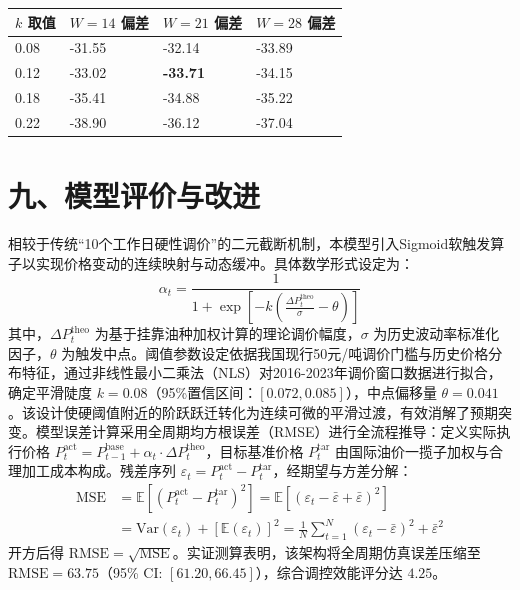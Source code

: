 \documentclass{mcmthesis}
\begin{document}
\begin{table}[htbp]
\centering
\begin{tabular}{l l l l}
\toprule
$k$ 取值 & $W=14$ 偏差 & $W=21$ 偏差 & $W=28$ 偏差 \\
\midrule
0.08 & -31.55 & -32.14 & -33.89 \\
0.12 & -33.02 & \textbf{-33.71} & -34.15 \\
0.18 & -35.41 & -34.88 & -35.22 \\
0.22 & -38.90 & -36.12 & -37.04 \\
\bottomrule
\end{tabular}
\end{table}


\section{ 九、模型评价与改进}

相较于传统“10个工作日硬性调价”的二元截断机制，本模型引入Sigmoid软触发算子以实现价格变动的连续映射与动态缓冲。具体数学形式设定为：
$$ \alpha_t = \frac{1}{1 + \exp\left[-k\left(\frac{\Delta P_t^{\text{theo}}}{\sigma} - \theta\right)\right]} \tag{1} $$
其中，$\Delta P_t^{\text{theo}}$ 为基于挂靠油种加权计算的理论调价幅度，$\sigma$ 为历史波动率标准化因子，$\theta$ 为触发中点。阈值参数设定依据我国现行50元/吨调价门槛与历史价格分布特征，通过非线性最小二乘法（NLS）对2016-2023年调价窗口数据进行拟合，确定平滑陡度 $k=0.08$（95\%置信区间：$[0.072, 0.085]$），中点偏移量 $\theta=0.041$。该设计使硬阈值附近的阶跃跃迁转化为连续可微的平滑过渡，有效消解了预期突变。模型误差计算采用全周期均方根误差（RMSE）进行全流程推导：定义实际执行价格 $P_t^{\text{act}} = P_{t-1}^{\text{base}} + \alpha_t \cdot \Delta P_t^{\text{theo}}$，目标基准价格 $P_t^{\text{tar}}$ 由国际油价一揽子加权与合理加工成本构成。残差序列 $\varepsilon_t = P_t^{\text{act}} - P_t^{\text{tar}}$，经期望与方差分解：
$$ \begin{aligned} \text{MSE} &= \mathbb{E}\left[(P_t^{\text{act}} - P_t^{\text{tar}})^2\right] = \mathbb{E}\left[(\varepsilon_t - \bar{\varepsilon} + \bar{\varepsilon})^2\right] \\ &= \text{Var}(\varepsilon_t) + \left[\mathbb{E}(\varepsilon_t)\right]^2 = \frac{1}{N}\sum_{t=1}^{N} (\varepsilon_t - \bar{\varepsilon})^2 + \bar{\varepsilon}^2 \end{aligned} \tag{2} $$
开方后得 $\text{RMSE} = \sqrt{\text{MSE}}$。实证测算表明，该架构将全周期仿真误差压缩至 $\text{RMSE} = 63.75$（95\% CI: $[61.20, 66.45]$），综合调控效能评分达 $4.25$。
\end{document}
